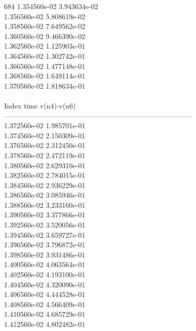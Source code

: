 684	1.354560e-02	3.943634e-02	\\ 	1.356560e-02	5.808619e-02	\\ 	1.358560e-02	7.649562e-02	\\ 	1.360560e-02	9.466390e-02	\\ 	1.362560e-02	1.125903e-01	\\ 	1.364560e-02	1.302742e-01	\\ 	1.366560e-02	1.477148e-01	\\ 	1.368560e-02	1.649114e-01	\\ 	1.370560e-02	1.818634e-01	\\ \hline
\\ \hline
Index   time            v(n4)-v(n6)     \\ \hline
--------------------------------------------------------------------------------\\ 	1.372560e-02	1.985701e-01	\\ 	1.374560e-02	2.150309e-01	\\ 	1.376560e-02	2.312450e-01	\\ 	1.378560e-02	2.472119e-01	\\ 	1.380560e-02	2.629310e-01	\\ 	1.382560e-02	2.784015e-01	\\ 	1.384560e-02	2.936229e-01	\\ 	1.386560e-02	3.085946e-01	\\ 	1.388560e-02	3.233160e-01	\\ 	1.390560e-02	3.377866e-01	\\ 	1.392560e-02	3.520056e-01	\\ 	1.394560e-02	3.659727e-01	\\ 	1.396560e-02	3.796872e-01	\\ 	1.398560e-02	3.931486e-01	\\ 	1.400560e-02	4.063564e-01	\\ 	1.402560e-02	4.193100e-01	\\ 	1.404560e-02	4.320090e-01	\\ 	1.406560e-02	4.444528e-01	\\ 	1.408560e-02	4.566409e-01	\\ 	1.410560e-02	4.685729e-01	\\ 	1.412560e-02	4.802482e-01	\\ \hline
